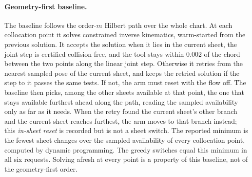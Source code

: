 \paragraph{Geometry-first baseline.}
The baseline follows the order-$m$ Hilbert path over the whole chart. At each collocation point it solves constrained inverse kinematics, warm-started from the previous solution. It accepts the solution when it lies in the current sheet, the joint step is certified collision-free, and the tool stays within $0.002$ of the chord between the two points along the linear joint step. Otherwise it retries from the nearest sampled pose of the current sheet, and keeps the retried solution if the step to it passes the same tests. If not, the arm must reset with the flow off. The baseline then picks, among the other sheets available at that point, the one that stays available furthest ahead along the path, reading the sampled availability only as far as it needs. When the retry found the current sheet's other branch and the current sheet reaches furthest, the arm moves to that branch instead; this \emph{in-sheet reset} is recorded but is not a sheet switch. The reported minimum is the fewest sheet changes over the sampled availability of every collocation point, computed by dynamic programming. The greedy switches equal this minimum in all six requests. Solving afresh at every point is a property of this baseline, not of the geometry-first order.

